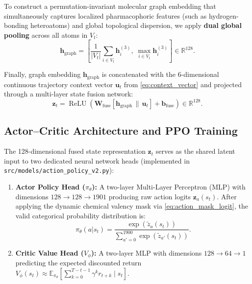 \documentclass{ieeeaccess}
\begin{document}
To construct a permutation-invariant molecular graph embedding that simultaneously captures localized pharmacophoric features (such as hydrogen-bonding heteroatoms) and global topological dispersion, we apply \textbf{dual global pooling} across all atoms in $V_t$:
\begin{equation}
\mathbf{h}_{\text{graph}} = \left[ \frac{1}{|V_t|} \sum_{i \in V_t} \mathbf{h}_i^{(3)}, \; \max_{i \in V_t} \mathbf{h}_i^{(3)} \right] \in \mathbb{R}^{128}.
\label{eq:dual_pooling}
\end{equation}

Finally, graph embedding $\mathbf{h}_{\text{graph}}$ is concatenated with the 6-dimensional continuous trajectory context vector $\mathbf{u}_t$ from \eqref{eq:context_vector} and projected through a multi-layer state fusion network:
\begin{equation}
\mathbf{z}_t = \operatorname{ReLU}\left( \mathbf{W}_{\text{fuse}} \left[ \mathbf{h}_{\text{graph}} \,\|\, \mathbf{u}_t \right] + \mathbf{b}_{\text{fuse}} \right) \in \mathbb{R}^{128}.
\label{eq:fused_state}
\end{equation}

\subsection{Actor--Critic Architecture and PPO Training}
The 128-dimensional fused state representation $\mathbf{z}_t$ serves as the shared latent input to two dedicated neural network heads (implemented in \texttt{src/models/action\_policy\_v2.py}):
\begin{enumerate}
    \item \textbf{Actor Policy Head ($\pi_\theta$):} A two-layer Multi-Layer Perceptron (MLP) with dimensions $128 \to 128 \to 1901$ producing raw action logits $\mathbf{z}_a(s_t)$. After applying the dynamic chemical valency mask via \eqref{eq:action_mask_logit}, the valid categorical probability distribution is:
    \begin{equation}
    \pi_\theta(a | s_t) = \frac{\exp(\tilde{z}_a(s_t))}{\sum_{a'=0}^{1900} \exp(\tilde{z}_{a'}(s_t))}.
    \label{eq:policy_softmax}
    \end{equation}
    \item \textbf{Critic Value Head ($V_\phi$):} A two-layer MLP with dimensions $128 \to 64 \to 1$ predicting the expected discounted return $V_\phi(s_t) \approx \mathbb{E}_{\pi_\theta} \left[ \sum_{k=0}^{T-t-1} \gamma^k r_{t+k} \mid s_t \right]$.
\end{enumerate}
\end{document}
